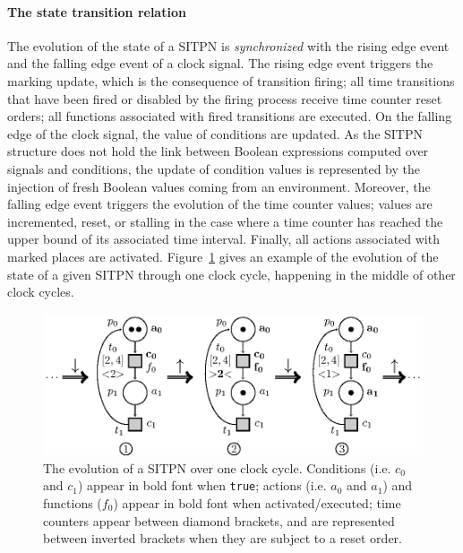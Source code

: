 

\paragraph{The state transition relation}

The evolution of the state of a SITPN is \textit{synchronized} with
the rising edge event and the falling edge event of a clock signal.
The rising edge event triggers the marking update, which is the
consequence of transition firing; all time transitions that have been
fired or disabled by the firing process receive time counter reset
orders; all functions associated with fired transitions are
executed. On the falling edge of the clock signal, the value of
conditions are updated. As the SITPN structure does not hold the link
between Boolean expressions computed over \vhdl{} signals and
conditions, the update of condition values is represented by the
injection of fresh Boolean values coming from an
environment. Moreover, the falling edge event triggers the evolution
of the time counter values; values are incremented, reset, or stalling
in the case where a time counter has reached the upper bound of its
associated time interval. Finally, all actions associated with marked
places are activated. Figure~\ref{fig:sitpn-state-exec} gives an
example of the evolution of the state of a given SITPN through one
clock cycle, happening in the middle of other clock cycles. %

\begin{figure}[H]
  \centering
  \includegraphics[keepaspectratio=true, width=.9\textwidth]{sitpn-state-evol.eps}
  \caption[Evolution of an SITPN over one clock cycle.]{The evolution
    of a SITPN over one clock cycle. Conditions (i.e. $c_0$ and $c_1$)
    appear in bold font when \texttt{true}; actions (i.e. $a_0$ and
    $a_1$) and functions ($f_0$) appear in bold font when
    activated/executed; time counters appear between diamond brackets,
    and are represented between inverted brackets when they are
    subject to a reset order.}
  \label{fig:sitpn-state-exec}
\end{figure}

